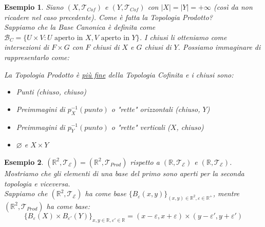 \documentclass[11pt,a4paper,twoside]{article}
\newtheorem{es}{Esempio}
\theoremstyle{definition}
\begin{document}
\begin{es}
	Siano $(X, \mathcal T_{Cof})$ e $(Y, \mathcal T_{Cof})$ con $|X| = |Y| = + \infty$ (così da non ricadere nel caso precedente). Come è fatta la Topologia Prodotto?\\
	Sappiamo che la Base Canonica è definita come $\mathcal B_C = \{U \times V: U \text{ aperto in }X, V \text{ aperto in }Y\}$. I chiusi li otteniamo come intersezioni di $F \times G$ con $F$ chiusi di $X$ e $G$ chiusi di $Y$. Possiamo immaginare di rappresentarlo come:

	\begin{center}
	\end{center}

	La Topologia Prodotto è \underline{più fine} della Topologia Cofinita e i chiusi sono:
	\begin{itemize}
		\item Punti (chiuso, chiuso)
		\item Preimmagini di $p_X^{-1}(punto)$ o "rette" orizzontali (chiuso, $Y$)
		\item Preimmagini di $p_Y^{-1}(punto)$ o "rette" verticali ($X$, chiuso)
		\item $\varnothing$ e $X \times Y$
	\end{itemize}
\end{es}

\begin{es}\label{es32}
	$(\mathbb R^2, \mathcal T_\mathcal E) = (\mathbb R^2, \mathcal T_{Prod})$ rispetto a $(\mathbb R, \mathcal T_\mathcal E)$ e $(\mathbb R, \mathcal T_\mathcal E)$.\\
	Mostriamo che gli elementi di una base del primo sono aperti per la seconda topologia e viceversa.\\
	Sappiamo che $(\mathbb R^2, \mathcal T_\mathcal E)$ ha come base $\{B_\varepsilon(x, y)\}_{(x,y) \in \mathbb R^2, \varepsilon \in \mathbb R^+}$, mentre $(\mathbb R^2, \mathcal T_{Prod})$ ha come base:
	\[ \{B_\varepsilon(X) \times B_{\varepsilon'}(Y)\}_{x,y\in \mathbb R, \varepsilon' \in \mathbb R} = (x- \varepsilon, x+ \varepsilon) \times (y-\varepsilon', y+ \varepsilon')\]
\end{es}
\end{document}

